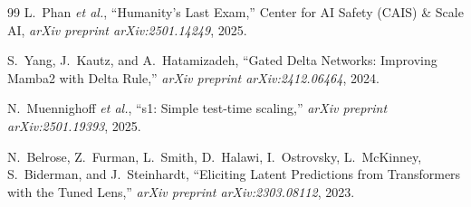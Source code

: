 \documentclass[11pt,a4paper]{article}
\begin{document}
\begin{thebibliography}{99}
L.~Phan \textit{et al.}, ``Humanity's Last Exam,'' Center for AI Safety (CAIS) \& Scale AI, \textit{arXiv preprint arXiv:2501.14249}, 2025.

S.~Yang, J.~Kautz, and A.~Hatamizadeh, ``Gated Delta Networks: Improving Mamba2 with Delta Rule,'' \textit{arXiv preprint arXiv:2412.06464}, 2024.

N.~Muennighoff \textit{et al.}, ``s1: Simple test-time scaling,'' \textit{arXiv preprint arXiv:2501.19393}, 2025.

N.~Belrose, Z.~Furman, L.~Smith, D.~Halawi, I.~Ostrovsky, L.~McKinney, S.~Biderman, and J.~Steinhardt, ``Eliciting Latent Predictions from Transformers with the Tuned Lens,'' \textit{arXiv preprint arXiv:2303.08112}, 2023.

\end{thebibliography}
\end{document}
